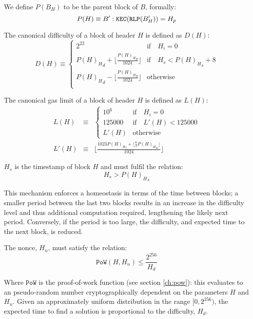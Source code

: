 \documentclass[9pt,oneside]{amsart}
\begin{document}
\begin{multicols}{2}
We define $P(B_H)$ to be the parent block of $B$, formally:
\begin{equation}
P(H) \equiv B': \mathtt{\tiny KEC}(\mathtt{\tiny RLP}(B'_H)) = H_p
\end{equation}

The canonical difficulty of a block of header $H$ is defined as $D(H)$:
\begin{equation}
D(H) \equiv \begin{cases}
2^{22} & \text{if} \quad H_i = 0\\
{P(H)_H}_d + \lfloor\frac{{P(H)_H}_d}{1024}\rfloor & \text{if} \quad H_s < {P(H)_H}_s + 8\\
{P(H)_H}_d - \lfloor\frac{{P(H)_H}_d}{1024}\rfloor & \text{otherwise}\\
\end{cases}
\end{equation}

The canonical gas limit of a block of header $H$ is defined as $L(H)$:
\begin{eqnarray}
L(H) & \equiv & \begin{cases}
10^6 & \text{if} \quad H_i = 0\\
125000 & \text{if} \quad L'(H) < 125000\\
L'(H) & \text{otherwise}
\end{cases}\\
L'(H) & \equiv & \big\lfloor \frac{1023 {P(H)_H}_l + \lfloor \frac{6}{5}{P(H)_H}_u \rfloor}{1024}\big\rfloor
\end{eqnarray}

$H_s$ is the timestamp of block $H$ and must fulfil the relation:
\begin{equation}
H_s > {P(H)_H}_s
\end{equation}

This mechanism enforces a homeostasis in terms of the time between blocks; a smaller period between the last two blocks results in an increase in the difficulty level and thus additional computation required, lengthening the likely next period. Conversely, if the period is too large, the difficulty, and expected time to the next block, is reduced.

The nonce, $H_n$, must satisfy the relation:
\begin{equation}
\mathtt{PoW}(H, H_n) \leqslant \frac{2^{256}}{H_d}
\end{equation}

Where $\mathtt{PoW}$ is the proof-of-work function (see section \ref{ch:pow}): this evaluates to an pseudo-random number cryptographically dependent on the parameters $H$ and $H_n$. Given an approximately uniform distribution in the range $[0, 2^{256})$, the expected time to find a solution is proportional to the difficulty, $H_d$.


\end{multicols}
\end{document}
